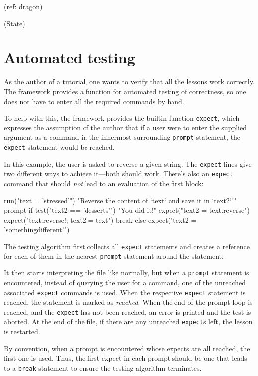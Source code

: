 \documentclass[paper=a4,twoside,abstract=on,cleardoublepage=empty,numbers=noenddot,toc=bib,12pt,appendixprefix=true]{scrreprt}
\begin{document}
(ref: dragon)

(State)

\section{Automated testing}

As the author of a tutorial, one wants to verify that all the lessons work correctly. The framework provides a function for automated testing of correctness, so one does not have to enter all the required commands by hand.

To help with this, the framework provides the builtin function \texttt{expect}, which expresses the assumption of the author that if a user were to enter the supplied argument as a command in the innermost surrounding \texttt{prompt} statement, the \texttt{expect} statement would be reached.

In this example, the user is asked to reverse a given string. The \texttt{expect} lines give two different ways to achieve it---both should work. There's also an \texttt{expect} command that should \emph{not} lead to an evaluation of the first block:

\begin{nutsh}
run("text = 'stressed'")
"Reverse the content of `text` and save it in `text2`!"
prompt {
    if test("text2 == 'desserts'") {
        "You did it!"
        expect("text2 = text.reverse")
        expect("text.reverse!; text2 = text")
        break
    } else {
        expect("text2 = 'somethingdifferent'")
    }
}
\end{nutsh}

The testing algorithm first collects all \texttt{expect} statements and creates a reference for each of them in the nearest \texttt{prompt} statement around the statement.

It then starts interpreting the file like normally, but when a \texttt{prompt} statement is encountered, instead of querying the user for a command, one of the unreached associated \texttt{expect} commands is used. When the respective \texttt{expect} statement is reached, the statement is marked as \emph{reached}. When the end of the prompt loop is reached, and the \texttt{expect} has not been reached, an error is printed and the test is aborted. At the end of the file, if there are any unreached \texttt{expect}s left, the lesson is restarted.

By convention, when a prompt is encountered whose expects are all reached, the first one is used. Thus, the first expect in each prompt should be one that leads to a \texttt{break} statement to ensure the testing algorithm terminates.
\end{document}
